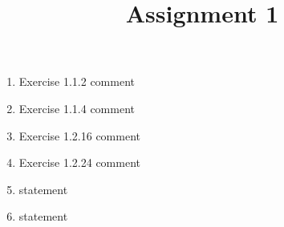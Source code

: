\documentclass[12pt, letterpaper]{../hwassignment}
\title{Assignment 1}
\newcommand{\bookproblem}[2]{
  \item Exercise #1.#2 {comment}
}
\newcommand{\extrahwproblem}[2]{
  \item {statement}
}
\begin{document}
  \maketitle

  \begin{enumerate}
    \bookproblem{1.1}{2}
    \bookproblem{1.1}{4}
    \bookproblem{1.2}{16}
    \bookproblem{1.2}{24}
    \extrahwproblem{1.1}{poll}
    \extrahwproblem{1.1}{potato}
  \end{enumerate}
\end{document}
